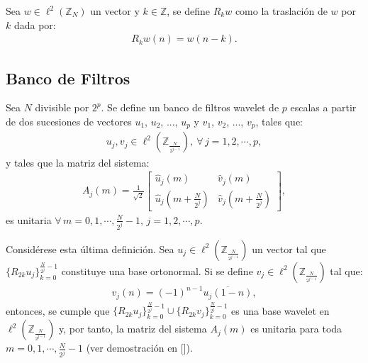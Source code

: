 \begin{definition}
Sea $w\in \ell^2(\mathbb{Z}_N)$ un vector y $k\in\mathbb{Z}$, se define $R_kw$ como la traslaci\'on de $w$ por $k$ dada por:
\begin{eqnarray}
R_kw(n)=w(n-k).\nonumber
\end{eqnarray}
\end{definition}

\subsection{Banco de Filtros}

\begin{definition}
Sea $N$ divisible por $2^p$. Se define un banco de filtros wavelet de $p$ escalas a partir de dos sucesiones de vectores $u_1$, $u_2$, ..., $u_p$ y $v_1$, $v_2$, ..., $v_p$, tales que:
\begin{eqnarray}
u_j, v_j \in \ell^2 \left(\mathbb{Z}_{\frac{N}{2^{j-1}}}\right),~\forall\,j=1,2,\cdots,p,\nonumber
\end{eqnarray}
y tales que la matriz del sistema:
\begin{eqnarray}
A_j(m) = \frac{1}{\sqrt{2}}\left[\begin{array}{cc}
\hat{u}_j(m)&\hat{v}_j(m)\\
\hat{u}_j\left(m+\frac{N}{2^j}\right)&\hat{v}_j\left(m+\frac{N}{2^j}\right)
\end{array}\right],\nonumber
\end{eqnarray}
es unitaria $\forall\,m=0,1,\cdots,\frac{N}{2^j}-1,\,j=1,2,\cdots,p$.
\label{banco-filtro}
\end{definition}

\par Consid\'erese esta \'ultima definici\'on. Sea $u_j\in \ell^2\left(\mathbb{Z}_{\frac{N}{2^{j-1}}}\right)$ un vector tal que $\{R_{2k}u_j\}_{k=0}^{\frac{N}{2^j}-1}$ constituye una base ortonormal. Si se define $v_j\in \ell^2\left(\mathbb{Z}_{\frac{N}{2^{j-1}}}\right)$ tal que:
\begin{eqnarray}
v_j(n)=(-1)^{n-1}\overline{u_j(1-n)},\nonumber
\end{eqnarray}
entonces, se cumple que $\{R_{2k}u_j\}_{k=0}^{\frac{N}{2^j}-1} \cup \{R_{2k}v_j\}_{k=0}^{\frac{N}{2^j}-1}$ es una base wavelet en $\ell^2\left(\mathbb{Z}_{\frac{N}{2^{j-1}}}\right)$ y, por tanto, la matriz del sistema $A_j(m)$ es unitaria para toda $m=0,1,\cdots,\frac{N}{2^j}-1$ (ver demostraci\'on en [\textcolor{cyan}{\cite{8}}]).\\

